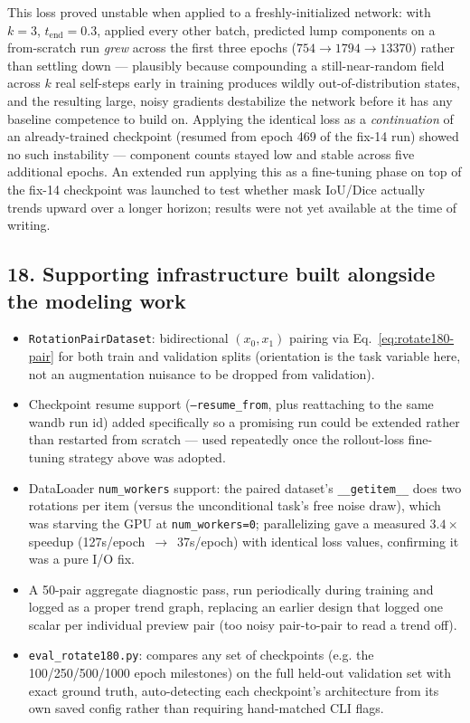 \documentclass[11pt]{article}
\newcommand{\hsub}[1]{\subsection*{#1}}
\begin{document}
This loss proved unstable when applied to a freshly-initialized network: with $k{=}3$,
$t_{\text{end}}{=}0.3$, applied every other batch, predicted lump components on a from-scratch
run \emph{grew} across the first three epochs ($754 \to 1794 \to 13370$) rather than settling
down --- plausibly because compounding a still-near-random field across $k$ real self-steps
early in training produces wildly out-of-distribution states, and the resulting large,
noisy gradients destabilize the network before it has any baseline competence to build on.
Applying the identical loss as a \emph{continuation} of an already-trained checkpoint (resumed
from epoch 469 of the fix-14 run) showed no such instability --- component counts stayed low
and stable across five additional epochs. An extended run applying this as a fine-tuning phase
on top of the fix-14 checkpoint was launched to test whether mask IoU/Dice actually trends
upward over a longer horizon; results were not yet available at the time of writing.

\hsub{18. Supporting infrastructure built alongside the modeling work}
\begin{itemize}[nosep]
\item \texttt{RotationPairDataset}: bidirectional $(x_0,x_1)$ pairing via
  Eq.~\eqref{eq:rotate180-pair} for both train and validation splits (orientation is the task
  variable here, not an augmentation nuisance to be dropped from validation).
\item Checkpoint resume support (\texttt{--resume\_from}, plus reattaching to the same wandb
  run id) added specifically so a promising run could be extended rather than restarted from
  scratch --- used repeatedly once the rollout-loss fine-tuning strategy above was adopted.
\item DataLoader \texttt{num\_workers} support: the paired dataset's \texttt{\_\_getitem\_\_}
  does two rotations per item (versus the unconditional task's free noise draw), which was
  starving the GPU at \texttt{num\_workers=0}; parallelizing gave a measured $3.4\times$
  speedup (127s/epoch~$\to$~37s/epoch) with identical loss values, confirming it was a pure
  I/O fix.
\item A 50-pair aggregate diagnostic pass, run periodically during training and logged as a
  proper trend graph, replacing an earlier design that logged one scalar per individual
  preview pair (too noisy pair-to-pair to read a trend off).
\item \texttt{eval\_rotate180.py}: compares any set of checkpoints (e.g. the 100/250/500/1000
  epoch milestones) on the full held-out validation set with exact ground truth, auto-detecting
  each checkpoint's architecture from its own saved config rather than requiring hand-matched
  CLI flags.
\end{itemize}
\end{document}
